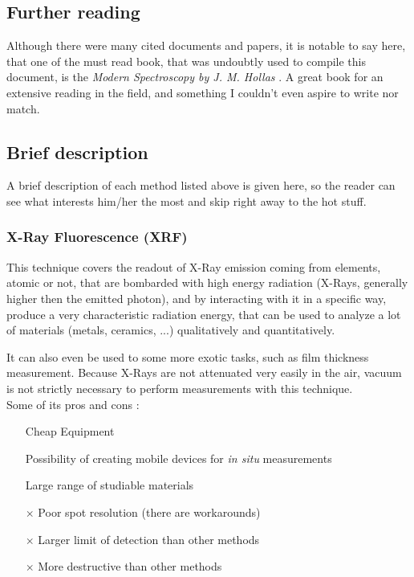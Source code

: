 \documentclass[]{article}
\begin{document}
\subsection{Further reading}
Although there were many cited documents and papers, it is notable to say here, that one of the must read book, that was undoubtly used to compile this document, is the \textit{Modern Spectroscopy by J. M. Hollas} \cite{JMH_Modern}. A great book for an extensive reading in the field, and something I couldn't even aspire to write nor match.

\subsection{Brief description}
A brief description of each method listed above is given here, so the reader can see what interests him/her the most and skip right away to the hot stuff.

\subsubsection{X-Ray Fluorescence (XRF)}
This technique covers the readout of X-Ray emission coming from elements, atomic or not, that are bombarded with high energy radiation (X-Rays, generally higher then the emitted photon), and by interacting with it in a specific way, produce a very characteristic radiation energy, that can be used to analyze a lot of materials (metals, ceramics, ...) qualitatively and quantitatively. 
\par It can also even be used to some more exotic tasks, such as film thickness measurement. Because X-Rays are not attenuated very easily in the air, vacuum is not strictly necessary to perform measurements with this technique.\\

Some of its pros and cons \cite{GI_XRF}:
\begin{itemize}
\item[\checkmark] Cheap Equipment
\item[\checkmark] Possibility of creating mobile devices for \textit{in situ} measurements
\item[\checkmark] Large range of studiable materials
\item[$\times$] Poor spot resolution (there are workarounds)
\item[$\times$] Larger limit of detection than other methods
\item[$\times$] More destructive than other methods
\end{itemize}
\end{document}
